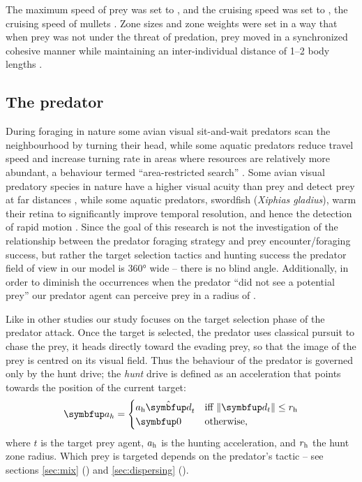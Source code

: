 The maximum speed of prey was set to , and the cruising speed was set to , the cruising speed of mullets \cite{videler1993fish}. Zone sizes and zone weights were set in a way that when prey was not under the threat of predation, prey moved in a synchronized cohesive manner while maintaining an inter-individual distance of 1--2 body lengths \cite{johansen2010kinematics,killen2011aerobic}.

\subsection{The predator}
 
During foraging in nature some avian visual sit-and-wait predators \cite{gall2010visual,orourke2010hawkeyes2} scan the neighbourhood by turning their head, while some aquatic predators reduce travel speed and increase turning rate in areas where resources are relatively more abundant, a behaviour termed ``area-restricted search'' \cite{thums2011insitu}. Some avian visual predatory species in nature have a higher visual acuity than prey and detect prey at far distances \cite{andersson2009predator}, while some aquatic predators, \eg swordfish (\emph{Xiphias gladius}), warm their retina to significantly improve temporal resolution, and hence the detection of rapid motion \cite{fritsches2005warm}. Since the goal of this research is not the investigation of the relationship between the predator foraging strategy and prey encounter/foraging success, but rather the target selection tactics and hunting success the predator field of view in our model is \ang{360} wide -- there is no blind angle. Additionally, in order to diminish the occurrences when the predator ``did not see a potential prey'' our predator agent can perceive prey in a radius of .

Like in other studies \cite{demsar2014simulated,kunz2006prey,nishimura2002predator,olson2013predator} our study focuses on the target selection phase of the predator attack. Once the target is selected, the predator uses classical pursuit \cite{nahin2012chases} to chase the prey, \ie it heads directly toward the evading prey, so that the image of the prey is centred on its visual field. Thus the behaviour of the predator is governed only by the hunt drive; the \emph{hunt} drive is defined as an acceleration that points towards the position of the current target:
%
\begin{equation}
\vec{a}_h=\begin{cases}
a_\textnormal{h} \uvec{d}_t & \textnormal{iff}\ \|\vec{d}_t\| \leq r_\textnormal{h} \\
\vec{0} & \textnormal{otherwise,}
\end{cases}
\end{equation}
%
where $t$ is the target prey agent, $a_\textnormal{h}$ is the hunting acceleration, and $r_\textnormal{h}$ the hunt zone radius. Which prey is targeted depends on the predator's tactic -- see sections \ref{sec:mix} () and \ref{sec:dispersing} (). 

